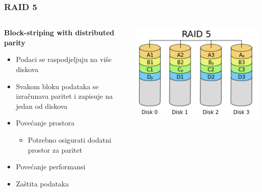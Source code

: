 \documentclass[t]{beamer}
\begin{document}
\begin{frame}
	\frametitle{RAID 5}
	
	\begin{columns}[T]
	\begin{column}{0.55\textwidth}
		\textbf{Block-striping with distributed parity}
		\begin{itemize}
			\item Podaci se raspodjeljuju na više diskova
			\item Svakom bloku podataka se izračunava paritet i zapisuje na jedan od diskova
		\end{itemize}
		\begin{itemize}
			\item Povećanje prostora
			\begin{itemize}
				\item Potrebno osigurati dodatni prostor za paritet
			\end{itemize}
			\item Povećanje performansi
			\item Zaštita podataka
		\end{itemize}
	\end{column}
	\begin{column}{0.45\textwidth}
		\includegraphics[width=\textwidth]{500px-RAID_5.png}
	\end{column}
	\end{columns}
\end{frame}
\end{document}
